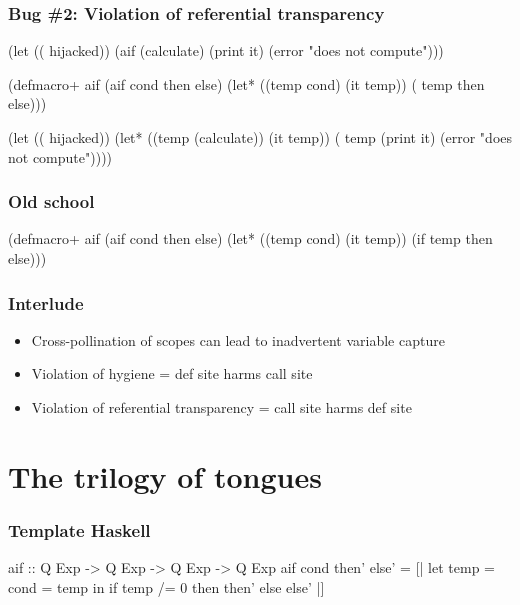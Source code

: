 \documentclass[hyperref={bookmarks=false}]{beamer}
\begin{document}
\begin{frame}[fragile]
\frametitle{Bug \#2: Violation of referential transparency}
\begin{semiverbatim}
(let ((\text{\color{blue}{if}} hijacked))
  (aif (calculate)
    (print it)
    (error "does not compute")))

(defmacro+ aif
  (aif cond then else)
  (let* ((temp cond)
         (it temp))
    (\text{\color{red}{if}} temp then else)))

(let ((\text{\color{blue}{if}} hijacked))
  (let* ((temp (calculate))
         (it temp))
    (\text{\color{blue}{if}} temp
      (print it)
      (error "does not compute"))))
\end{semiverbatim}
\end{frame}

\begin{frame}[fragile]
\frametitle{Old school}
\begin{semiverbatim}
(defmacro+ aif
  (aif cond then else)
    (let* ((temp cond)
           (it temp))
      (if temp then else)))
\end{semiverbatim}

\end{frame}

\begin{frame}[fragile]
\frametitle{Interlude}
\begin{itemize}
\item Cross-pollination of scopes can lead to inadvertent variable capture
\item Violation of hygiene = def site harms call site
\item Violation of referential transparency = call site harms def site
\end{itemize}
\end{frame}

\section{The trilogy of tongues}

\begin{frame}[fragile]
\frametitle{Template Haskell}
\begin{semiverbatim}

aif :: Q Exp -> Q Exp -> Q Exp -> Q Exp
aif cond then' else' =
  [| let temp = {\textdollar}cond
          = temp
     in if temp /= 0 then {\textdollar}then' else {\textdollar}else' |]


\end{semiverbatim}
\end{frame}
\end{document}
